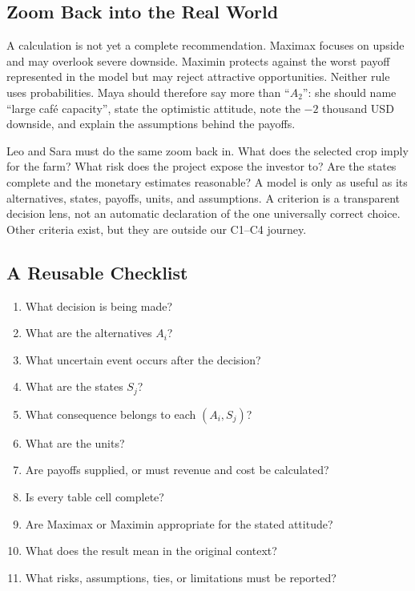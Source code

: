 	
	
	\subsection{Zoom Back into the Real World}
	\label{sec:real-world-interpretation}
	
	A calculation is not yet a complete recommendation. Maximax focuses on upside
	and may overlook severe downside. Maximin protects against the worst payoff
	represented in the model but may reject attractive opportunities. Neither rule
	uses probabilities. Maya should therefore say more than ``\(A_2\)'': she
	should name ``large café capacity'', state the optimistic attitude, note the
	\(-2\) thousand USD downside, and explain the assumptions behind the payoffs.
	
	Leo and Sara must do the same zoom back in. What does the selected crop imply
	for the farm? What risk does the project expose the investor to? Are the states
	complete and the monetary estimates reasonable? A model is only as useful as
	its alternatives, states, payoffs, units, and assumptions. A criterion is a
	transparent decision lens, not an automatic declaration of the one universally
	correct choice. Other criteria exist, but they are outside our C1--C4 journey.
	
	
	
	\subsection{A Reusable Checklist}
	\label{sec:reusable-checklist}
	\begin{enumerate}[label=\textbf{\arabic*.},leftmargin=2em]
		\item What decision is being made?
		\item What are the alternatives \(A_i\)?
		\item What uncertain event occurs after the decision?
		\item What are the states \(S_j\)?
		\item What consequence belongs to each \((A_i,S_j)\)?
		\item What are the units?
		\item Are payoffs supplied, or must revenue and cost be calculated?
		\item Is every table cell complete?
		\item Are Maximax or Maximin appropriate for the stated attitude?
		\item What does the result mean in the original context?
		\item What risks, assumptions, ties, or limitations must be reported?
	\end{enumerate}
	
